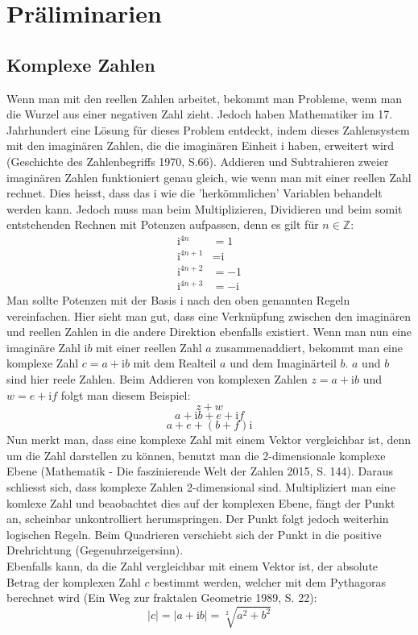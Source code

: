 \section{Präliminarien}
\subsection{Komplexe Zahlen}
Wenn man mit den reellen Zahlen arbeitet, bekommt man Probleme, wenn man die Wurzel aus einer negativen Zahl zieht. Jedoch haben Mathematiker im 17. Jahrhundert eine Lösung für dieses Problem entdeckt, indem dieses Zahlensystem mit den imaginären Zahlen, die die imaginären Einheit i haben, erweitert wird (Geschichte des Zahlenbegriffs 1970, S.66). Addieren und Subtrahieren zweier imaginären Zahlen funktioniert genau gleich, wie wenn man mit einer reellen Zahl rechnet. Dies heisst, dass das i wie die 'herkömmlichen' Variablen behandelt werden kann. Jedoch muss man beim Multiplizieren, Dividieren und beim somit entstehenden Rechnen mit Potenzen aufpassen, denn es gilt für $n \in \mathbb{Z}$:
\begin{align*}
\text{i}^{4n} &= 1 \\
\text{i}^{4n+1} &= \text{i} \\
\text{i}^{4n+2} &= -1 \\
\text{i}^{4n+3} &= -\text{i}
\end{align*}
Man sollte Potenzen mit der Basis i nach den oben genannten Regeln vereinfachen. Hier sieht man gut, dass eine Verknüpfung zwischen den imaginären und reellen Zahlen in die andere Direktion ebenfalls existiert. Wenn man nun eine imaginäre Zahl $\text{i}b$ mit einer reellen Zahl $a$ zusammenaddiert, bekommt man eine komplexe Zahl  $c=a+\text{i}b$ mit dem Realteil $a$ und dem Imaginärteil $b$. $a$ und $b$ sind hier reele Zahlen. Beim Addieren von komplexen Zahlen $z=a+\text{i}b$ und $w=e+\text{i}f$ folgt man diesem Beispiel:
\[z+w\]
\[a+\text{i}b+e+\text{i}f\]
\[a+e+(b+f)\text{i}\]
Nun merkt man, dass eine komplexe Zahl mit einem Vektor vergleichbar ist, denn um die Zahl darstellen zu können, benutzt man die 2-dimensionale komplexe Ebene (Mathematik - Die faszinierende Welt der Zahlen 2015, S. 144). Daraus schliesst sich, dass komplexe Zahlen 2-dimensional sind. Multipliziert man eine komlexe Zahl und beaobachtet dies auf der komplexen Ebene, fängt der Punkt an, scheinbar unkontrolliert herumspringen. Der Punkt folgt jedoch weiterhin logischen Regeln. Beim Quadrieren verschiebt sich der Punkt in die positive Drehrichtung (Gegenuhrzeigersinn).
\\
Ebenfalls kann, da die Zahl vergleichbar mit einem Vektor ist, der absolute Betrag der komplexen Zahl $c$ bestimmt werden, welcher mit dem Pythagoras berechnet wird (Ein Weg zur fraktalen Geometrie 1989, S. 22):
\[|c| = |a+\text{i}b| = \sqrt[2]{a^2+b^2}\]

